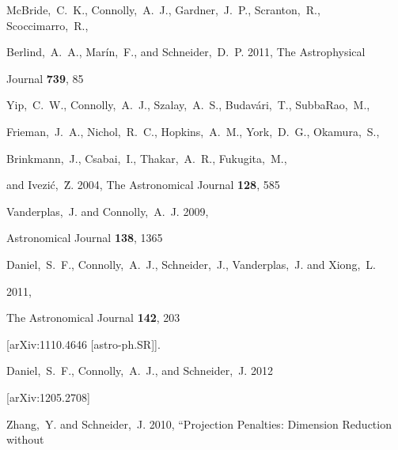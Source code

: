 \documentclass[prd,nofootbib,floatfix,11pt,tightenlines,nofootinbib]{revtex4}
\begin{document}
\begin{thebibliography}{99}

McBride,~C.~K., Connolly,~A.~J., Gardner,~J.~P., Scranton,~R., Scoccimarro,~R.,

Berlind,~A.~A., Mar\'in,~F., and Schneider,~D.~P. 2011, The Astrophysical

Journal {\bf 739}, 85









Yip,~C.~W., Connolly,~A.~J., Szalay,~A.~S., Budav\'ari,~T., SubbaRao,~M.,

Frieman,~J.~A., Nichol,~R.~C., Hopkins,~A.~M., York,~D.~G., Okamura,~S.,

Brinkmann,~J., Csabai,~I., Thakar,~A.~R., Fukugita,~M., 

and Ivezi\'c,~\u Z. 2004, The Astronomical Journal {\bf 128}, 585




Vanderplas,~J. and Connolly,~A.~J. 2009,

Astronomical Journal {\bf 138}, 1365





  Daniel,~S.~F., Connolly,~A.~J., Schneider,~J., Vanderplas,~J. and Xiong,~L.

  2011, 


  The Astronomical Journal  {\bf 142}, 203

  [arXiv:1110.4646 [astro-ph.SR]].





Daniel,~S.~F., Connolly,~A.~J., and Schneider,~J. 2012

[arXiv:1205.2708]




Zhang,~Y. and Schneider,~J. 2010, ``Projection Penalties: Dimension Reduction without


\end{thebibliography}
\end{document}
